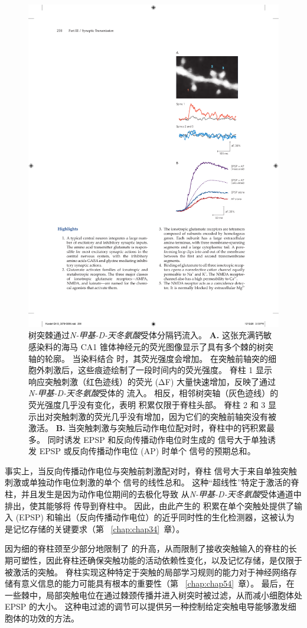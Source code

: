 \begin{figure}[htbp]
	\centering
	\includegraphics[width=0.4\linewidth]{chap13/fig_13_18}
	\caption{树突棘通过\textit{N-甲基-D-天冬氨酸}受体分隔钙流入。
		\textbf{A.} 这张充满钙敏感染料的海马 CA1 锥体神经元的荧光图像显示了具有多个棘的树突轴的轮廓。
		当染料结合  时，其荧光强度会增加。
		在突触前轴突的细胞外刺激后，这些痕迹绘制了一段时间内的荧光强度。
		脊柱 1 显示响应突触刺激（红色迹线）的荧光 (ΔF) 大量快速增加，反映了通过\textit{N-甲基-D-天冬氨酸}受体的  流入。
		相反，相邻树突轴（灰色迹线）的荧光强度几乎没有变化，表明  积累仅限于脊柱头部。
		脊柱 2 和 3 显示出对突触刺激的荧光几乎没有增加，因为它们的突触前轴突没有被激活\cite{lang2004transient}。 
		\textbf{B.} 当突触刺激与突触后动作电位配对时，脊柱中的钙积累最多。
		同时诱发 EPSP 和反向传播动作电位时生成的  信号大于单独诱发 EPSP 或反向传播动作电位 (AP) 时单个  信号的预期总和\cite{yuste1995dendritic}。}
	\label{fig:13_18}
\end{figure}


事实上，当反向传播动作电位与突触前刺激配对时，脊柱  信号大于来自单独突触刺激或单独动作电位刺激的单个  信号的线性总和。
这种“超线性”特定于激活的脊柱，并且发生是因为动作电位期间的去极化导致  从\textit{N-甲基-D-天冬氨酸}受体通道中排出，使其能够将  传导到脊柱中。
因此，由此产生的  积累在单个突触处提供了输入 (EPSP) 和输出（反向传播动作电位）的近乎同时性的生化检测器，这被认为是记忆存储的关键要求（第 ~\ref{chap:chap34}~章）。


因为细的脊柱颈至少部分地限制了  的升高，从而限制了接收突触输入的脊柱的长期可塑性，因此脊柱还确保突触功能的活动依赖性变化，以及记忆存储，是仅限于被激活的突触。
脊柱实现这种特定于突触的局部学习规则的能力对于神经网络存储有意义信息的能力可能具有根本的重要性（第 ~\ref{chap:chap54}~章）。
最后，在一些棘中，局部突触电位在通过棘颈传播并进入树突时被过滤，从而减小细胞体处 EPSP 的大小。
这种电过滤的调节可以提供另一种控制给定突触电导能够激发细胞体的功效的方法。



